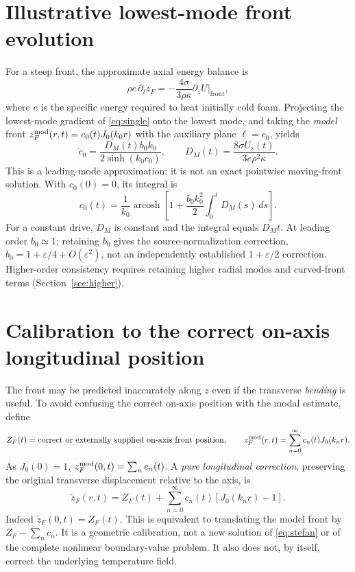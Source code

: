 \documentclass[11pt]{article}
\numberwithin{equation}{section}
\begin{document}
\section{Illustrative lowest-mode front evolution}
For a steep front, the approximate axial energy balance is
\begin{equation}\rho e\,\partial_t z_F=-\frac{4\sigma}{3\rho\kappa}\left.\partial_zU\right|_{\mathrm{front}},\label{eq:stefan}\end{equation}
where $e$ is the specific energy required to heat initially cold foam. Projecting the lowest-mode gradient of \eqref{eq:single} onto the lowest mode, and taking the \emph{model} front $z_F^{\rm mod}(r,t)=c_0(t)J_0(k_0r)$ with the auxiliary plane $\ell=c_0$, yields
\begin{equation}\dot c_0=\frac{D_M(t)b_0k_0}{2\sinh(k_0c_0)},\qquad D_M(t)=\frac{8\sigma U_s(t)}{3e\rho^2\kappa}.\label{eq:c0ode}\end{equation}
This is a leading-mode approximation; it is not an exact pointwise moving-front solution. With $c_0(0)=0$, its integral is
\begin{equation}\boxed{c_0(t)=\frac1{k_0}\operatorname{arcosh}\!\left[1+\frac{b_0k_0^2}{2}\int_0^t D_M(s)\,ds\right].}\label{eq:c0}\end{equation}
For a constant drive, $D_M$ is constant and the integral equals $D_Mt$. At leading order $b_0\simeq1$; retaining $b_0$ gives the source-normalization correction, $b_0=1+\varepsilon/4+O(\varepsilon^2)$, not an independently established $1+\varepsilon/2$ correction. Higher-order consistency requires retaining higher radial modes and curved-front terms (Section~\ref{sec:higher}).

\section{Calibration to the correct on-axis longitudinal position}\label{sec:calib}
The front may be predicted inaccurately along $z$ even if the transverse \emph{bending} is useful. To avoid confusing the correct on-axis position with the modal estimate, define
\begin{equation}Z_F(t)=\text{correct or externally supplied on-axis front position},\qquad
z_F^{\rm mod}(r,t)=\sum_{n=0}^\infty c_n(t)J_0(k_nr).\end{equation}
As $J_0(0)=1$, $z_F^{\rm mod}(0,t)=\sum_nc_n(t)$. A \emph{pure longitudinal correction}, preserving the original transverse displacement relative to the axis, is
\begin{equation}\boxed{\widetilde z_F(r,t)=Z_F(t)+\sum_{n=0}^\infty c_n(t)\left[J_0(k_nr)-1\right].}\label{eq:corrected}\end{equation}
Indeed $\widetilde z_F(0,t)=Z_F(t)$. This is equivalent to translating the model front by $Z_F-\sum_nc_n$. It is a geometric calibration, not a new solution of \eqref{eq:stefan} or of the complete nonlinear boundary-value problem. It also does not, by itself, correct the underlying temperature field.
\end{document}
